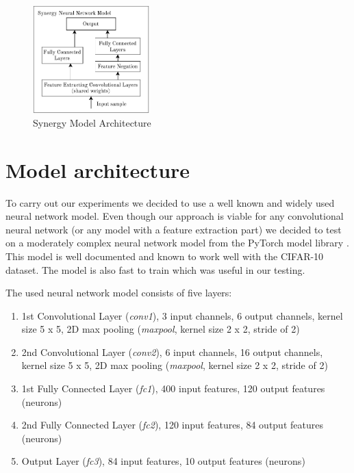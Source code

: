 \documentclass[b5paper]{book}
\let\cite\parencite
\begin{document}
\begin{figure}
\centering
  \includegraphics[width=0.4\textwidth]{figures/fig1.pdf}
\caption{Synergy Model Architecture}
\label{fig:1}       %
\end{figure}

\section{Model architecture}
\label{modelarch}

To carry out our experiments we decided to use a well known and widely used neural network model. Even though our approach is viable for any convolutional neural network (or any model with a feature extraction part) we decided to test on a moderately complex neural network model from the PyTorch model library \cite{paszke2017automatic,paszke2017pytorch}. This model is well documented and known to work well with the CIFAR-10 dataset. The model is also fast to train which was useful in our testing. 

The used neural network model consists of five layers:

\begin{enumerate}
    \item 1st Convolutional Layer (\emph{conv1}), 3 input channels, 6 output channels, kernel size 5 x 5, 2D max pooling (\emph{maxpool}, kernel size 2 x 2, stride of 2)
    \item 2nd Convolutional Layer (\emph{conv2}), 6 input channels, 16 output channels, kernel size 5 x 5, 2D max pooling (\emph{maxpool}, kernel size 2 x 2, stride of 2)
    \item 1st Fully Connected Layer (\emph{fc1}), 400 input features, 120 output features (neurons)
    \item 2nd Fully Connected Layer (\emph{fc2}), 120 input features, 84 output features (neurons)
    \item Output Layer (\emph{fc3}), 84 input features, 10 output features (neurons)
\end{enumerate}
\end{document}
